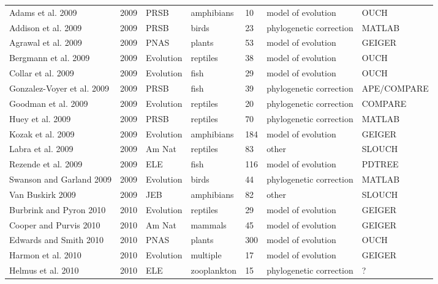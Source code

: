 \begin{landscape}
\begin{center}
\begin{longtable}{p{6cm}llllll}
Adams et al. 2009 &   2009    &   PRSB    &   amphibians  &   10  &   model of evolution  &   OUCH    \\
Addison et al. 2009   &   2009    &   PRSB    &   birds   &   23  &   phylogenetic correction &   MATLAB  \\
Agrawal et al. 2009   &   2009    &   PNAS    &   plants  &   53  &   model of evolution  &   GEIGER  \\
Bergmann et al. 2009  &   2009    &   Evolution   &   reptiles    &   38  &   model of evolution  &   OUCH    \\
Collar et al. 2009    &   2009    &   Evolution   &   fish    &   29  &   model of evolution  &   OUCH    \\
Gonzalez-Voyer et al. 2009    &   2009    &   PRSB    &   fish    &   39  &   phylogenetic correction &   APE/COMPARE \\
Goodman et al. 2009   &   2009    &   Evolution   &   reptiles    &   20  &   phylogenetic correction &   COMPARE \\
Huey et al. 2009  &   2009    &   PRSB    &   reptiles    &   70  &   phylogenetic correction &   MATLAB  \\
Kozak et al. 2009 &   2009    &   Evolution   &   amphibians  &   184 &   model of evolution  &   GEIGER  \\
Labra et al. 2009 &   2009    &   Am Nat  &   reptiles    &   83  &   other   &   SLOUCH  \\
Rezende et al. 2009   &   2009    &   ELE &   fish    &   116 &   model of evolution  &   PDTREE  \\
Swanson and Garland 2009  &   2009    &   Evolution   &   birds   &   44  &   phylogenetic correction &   MATLAB  \\
Van Buskirk 2009  &   2009    &   JEB &   amphibians  &   82  &   other   &   SLOUCH  \\
Burbrink and Pyron 2010   &   2010    &   Evolution   &   reptiles    &   29  &   model of evolution  &   GEIGER  \\
Cooper and Purvis 2010    &   2010    &   Am Nat  &   mammals &   45  &   model of evolution  &   GEIGER  \\
Edwards and Smith 2010    &   2010    &   PNAS    &   plants  &   300 &   model of evolution  &   OUCH    \\
Harmon et al. 2010    &   2010    &   Evolution   &   multiple    &   17  &   model of evolution  &   GEIGER  \\
Helmus et al. 2010    &   2010    &   ELE &   zooplankton &   15  &   phylogenetic correction &   ?   \\

\end{longtable}
\end{center}
\end{landscape}
